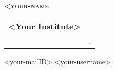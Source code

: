 \documentclass[letterpaper,11pt]{article}
\makeatletter
\newcommand{\resumeSubheading}[4]{
  \vspace{-2pt}\item
    \begin{tabular*}{0.97\textwidth}[t]{l@{\extracolsep{\fill}}r}
      \textbf{#1} & #2 \\
      \textit{\small#3} & \textit{\small #4} \\
    \end{tabular*}\vspace{-7pt}
}
\makeatother
\begin{document}

\begin{left}

    \textbf{\Huge \scshape <your-name} \\ \vspace{3pt}
    \resumeSubheading {
    \color{<color>}
    \Large
    {<Your Institute>}
    }
    \small
    \hspace{.}
    
    { \color{<color>} \faAt} \hspace{.5pt} \href{mailto:<your-mailID>@gmail.com}{<your-mailID>}
    \hspace{.5pt}
    { \color{<color>} \faAt} \hspace{.5pt} \href{other-socials}{<your-username>}
    \hspace{.5pt}
\end{left}


\end{document}
